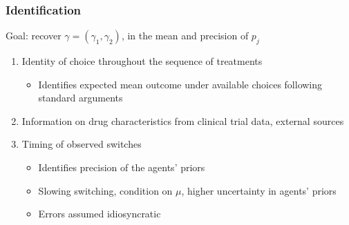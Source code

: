 \documentclass[xcolor=pdftex,dvipsnames,table,mathserif,aspectratio=169]{beamer}
\begin{document}

\begin{frame}
\frametitle{Identification}

Goal: recover $\gamma=(\gamma_{1},\gamma_{2})$, in the mean and precision of 
$p_{j}$

\begin{enumerate}
\item Identity of choice throughout the sequence of treatments

\begin{itemize}
\item Identifies expected mean outcome under available choices following
standard arguments
\end{itemize}

\item Information on drug characteristics from clinical trial data, external
sources

\item Timing of observed switches

\begin{itemize}
\item Identifies precision of the agents' priors

\item Slowing switching, condition on $\mu$, higher uncertainty in agents'
priors

\item Errors assumed idiosyncratic
\end{itemize}
\end{enumerate}
\end{frame}

\end{document}
